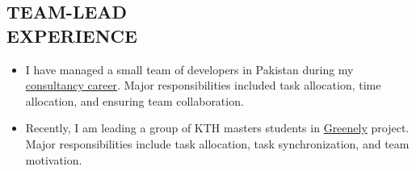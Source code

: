 \documentclass[margin, 10pt]{res} %
\begin{document}
\begin{resume}

\section{TEAM-LEAD \\ EXPERIENCE}
\begin{itemize}
\item I have managed a small team of developers in Pakistan during my \href{https://www.odesk.com/users/~013a228837c241737c}{consultancy career}. Major responsibilities included task allocation, time allocation, and ensuring team collaboration.
\item Recently, I am leading a group of KTH masters students in \href{https://www.youtube.com/watch?v=COsyhfX7Pes}{Greenely} project. Major responsibilities include task allocation, task synchronization, and team motivation.
\end{itemize}



\end{resume}
\end{document}

